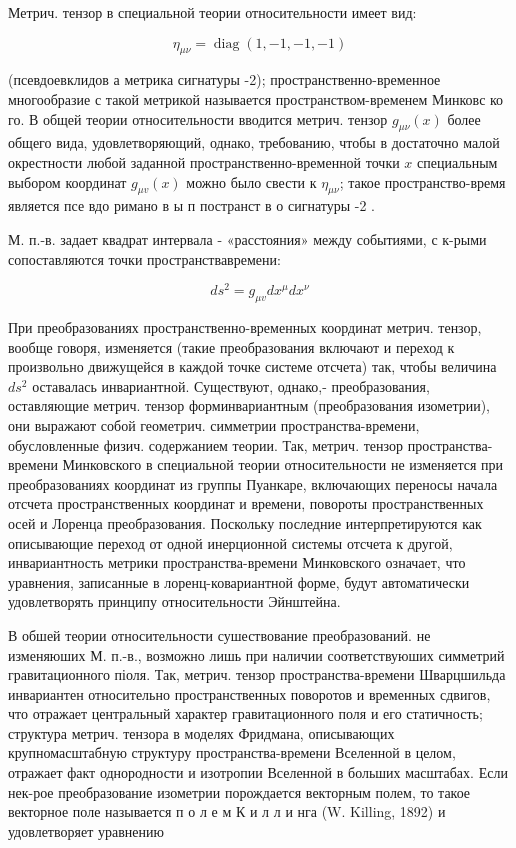 \documentclass[10pt]{article}
\begin{document}
Метрич. тензор в специальной теории относительности имеет вид:



\[

\eta_{\mu \nu}=\operatorname{diag}(1,-1,-1,-1)

\]



(псевдоевклидов а метрика сигнатуры -2); пространственно-временное многообразие с такой метрикой называется пространством-временем Минковс ко го. В общей теории относительности вводится метрич. тензор $g_{\mu \nu}(x)$ более общего вида, удовлетворяющий, однако, требованию, чтобы в достаточно малой окрестности любой заданной пространственно-временной точки $x$ специальным выбором координат $g_{\mu v}(x)$ можно было свести к $\eta_{\mu \nu}$; такое пространство-время является псе вдо римано в ы п постранст в о сигнатуры -2 .



М. п.-в. задает квадрат интервала - «расстояния» между событиями, с к-рыми сопоставляются точки пространствавремени:



\[

d s^{2}=g_{\mu v} d x^{\mu} d x^{\nu}

\]



При преобразованиях пространственно-временных координат метрич. тензор, вообще говоря, изменяется (такие преобразования включают и переход к произвольно движущейся в каждой точке системе отсчета) так, чтобы величина $d s^{2}$ оставалась инвариантной. Существуют, однако,- преобразования, оставляющие метрич. тензор форминвариантным (преобразования изометрии), они выражают собой геометрич. симметрии пространства-времени, обусловленные физич. содержанием теории. Так, метрич. тензор пространства-времени Минковского в специальной теории относительности не изменяется при преобразованиях координат из группы Пуанкаре, включающих переносы начала отсчета пространственных координат и времени, повороты пространственных осей и Лоренца преобразования. Поскольку последние интерпретируются как описывающие переход от одной инерционной системы отсчета к другой, инвариантность метрики пространства-времени Минковского означает, что уравнения, записанные в лоренц-ковариантной форме, будут автоматически удовлетворять принципу относительности Эйнштейна.



В обшей теории относительности сушествование преобразований. не изменяюших М. п.-в., возможно лишь при наличии соответствуюших симметрий гравитационного піоля. Так, метрич. тензор пространства-времени Шварцшильда инвариантен относительно пространственных поворотов и временных сдвигов, что отражает центральный характер гравитационного поля и его статичность; структура метрич. тензора в моделях Фридмана, описывающих крупномасштабную структуру пространства-времени Вселенной в целом, отражает факт однородности и изотропии Вселенной в больших масштабах. Если нек-рое преобразование изометрии порождается векторным полем, то такое векторное поле называется п о л е м К и л л и нга (W. Killing, 1892) и удовлетворяет уравнению
\end{document}
